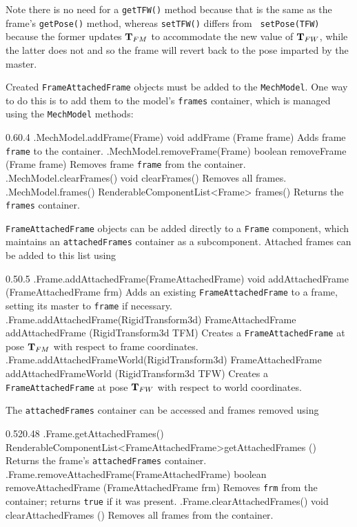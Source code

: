 Note there is no need for a {\tt getTFW()} method because that is the same as
the frame's {\tt getPose()} method, whereas {\tt setTFW()} differs from {\tt
setPose(TFW)} because the former updates ${\bf T}_{FM}$ to accommodate the new value
of ${\bf T}_{FW}$, while the latter does not and so the frame will revert back to
the pose imparted by the master.

Created {\tt FrameAttachedFrame} objects must be added to the {\tt MechModel}.
One way to do this is to add them to the model's {\tt frames} container, which
is managed using the {\tt MechModel} methods:
%
\begin{methodtable}{0.6}{0.4}
\midline
%
\methodentry
{\mech.MechModel.addFrame(Frame)}%
{void addFrame (Frame frame)}%
{Adds frame {\tt frame} to the container.}%
%
\methodentry
{\mech.MechModel.removeFrame(Frame)}%
{boolean removeFrame (Frame frame)}%
{Removes frame {\tt frame} from the container.}%
%
\methodentry
{\mech.MechModel.clearFrames()}%
{void clearFrames()}%
{Removes all frames.}%
%
\methodentry
{\mech.MechModel.frames()}%
{RenderableComponentList<Frame> frames()}%
{Returns the {\tt frames} container.}%
%
\midline
\end{methodtable}

{\tt FrameAttachedFrame} objects can be added directly to a {\tt Frame}
component, which maintains an {\tt attachedFrames} container as
a subcomponent. Attached frames can be added to this list using
%
\begin{methodtable}{0.5}{0.5}
\midline
%
\methodentry
{\mech.Frame.addAttachedFrame(FrameAttachedFrame)}%
{void addAttachedFrame (FrameAttachedFrame frm)}%
{Adds an existing {\tt FrameAttachedFrame} to a frame, 
setting its master to {\tt frame} if necessary.}%
%
\methodentry
{\mech.Frame.addAttachedFrame(RigidTransform3d)}%
{FrameAttachedFrame addAttachedFrame (\brh RigidTransform3d TFM)}%
{Creates a {\tt FrameAttachedFrame} at pose ${\bf T}_{FM}$
with respect to frame coordinates.}%
%
\methodentry
{\mech.Frame.addAttachedFrameWorld(RigidTransform3d)}%
{FrameAttachedFrame addAttachedFrameWorld (\brh RigidTransform3d TFW)}%
{Creates a {\tt FrameAttachedFrame} at pose ${\bf T}_{FW}$
with respect to world coordinates.}%
%
\midline
\end{methodtable}
%
The {\tt attachedFrames} container can be accessed and frames removed using
%
\begin{methodtable}{0.52}{0.48}
\midline
%
\methodentry
{\mech.Frame.getAttachedFrames()}%
{RenderableComponentList<FrameAttachedFrame>\brh getAttachedFrames ()}%
{Returns the frame's {\tt attachedFrames} container.}%
%
\methodentry
{\mech.Frame.removeAttachedFrame(FrameAttachedFrame)}%
{boolean removeAttachedFrame (\brh FrameAttachedFrame frm)}%
{Removes {\tt frm} from the container; returns {\tt true} if it was present.}%
%
\methodentry
{\mech.Frame.clearAttachedFrames()}%
{void clearAttachedFrames ()}%
{Removes all frames from the container.}%
%
\midline
\end{methodtable}

